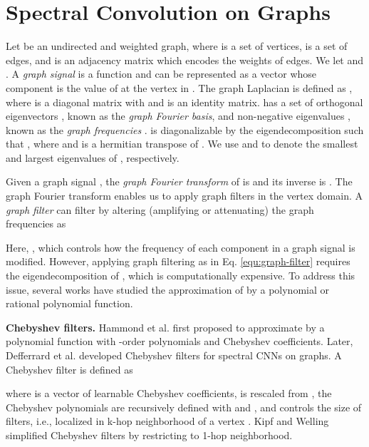 \documentclass{article}
\begin{document}
 \section{Spectral Convolution on Graphs}
\label{sec:sepectral-filters}\vspace{-0.2cm}
Let  be an undirected and weighted graph, where  is a set of vertices,  is  a set of edges, and  is an adjacency matrix which encodes the weights of edges. We let  and . A \emph{graph signal} is a function  and can be represented as a vector  whose  component  is the value of  at the  vertex in .  The graph Laplacian is defined as , where  is a diagonal matrix with  and  is an identity matrix.  has a set of orthogonal eigenvectors , known as the \emph{graph Fourier basis}, and non-negative eigenvalues , known as the \emph{graph frequencies} \cite{chung1997spectral}. 
 is diagonalizable by the eigendecomposition such that , where  and  is a hermitian transpose of . We use  and  to denote the smallest and largest eigenvalues of , respectively.


Given a graph signal , the \emph{graph Fourier transform} of  is  and its inverse is  \cite{sandryhaila2013discrete,shuman2013emerging}. The graph Fourier transform enables us to apply graph filters in the vertex domain. A \emph{graph filter}  can filter  by altering (amplifying or attenuating) the graph frequencies as 

Here, , which controls how the frequency of each component in a graph signal  is modified. However, applying graph filtering as in Eq. \ref{equ:graph-filter} requires the eigendecomposition of , which is computationally expensive. To address this issue, several works \cite{bianchi2019graph, defferrard2016convolutional,hammond2011wavelets,kipf2016semi,levie2017cayleynets,liao2019lanczosnet} have studied the approximation of  by a polynomial or rational polynomial function. 



\smallskip
\textbf{Chebyshev filters.   } Hammond et al. \cite{hammond2011wavelets} first proposed to approximate  by  a polynomial function with -order polynomials and Chebyshev coefficients. Later, Defferrard et al. \cite{defferrard2016convolutional} developed Chebyshev filters for spectral CNNs on graphs. A Chebyshev filter is defined as

where  is a vector of learnable Chebyshev coefficients,  is rescaled from , the Chebyshev polynomials  are recursively defined with  and , and  controls the size of filters, i.e., localized in k-hop neighborhood of a vertex \cite{hammond2011wavelets}. Kipf and Welling \cite{kipf2016semi} simplified Chebyshev filters by restricting to 1-hop neighborhood.
\end{document}
